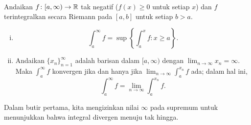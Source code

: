 \begin{prop} \label{impropriemann:possimp}
Andaikan $f \colon [a,\infty) \to {\mathbb{R}}$ tak negatif ($f(x)
\geq 0$ untuk setiap $x$) dan
$f$ terintegralkan secara Riemann pada $[a,b]$ untuk setiap $b > a$.
\begin{enumerate}[(i)]
\item 
\begin{equation*}
\int_a^\infty f = \sup \left\{ \int_a^x f : x \geq a \right\} .
\end{equation*}
\item
Andaikan $\{ x_n \}_{n=1}^\infty$ adalah barisan dalam $[a,\infty)$
dengan $\lim_{n\to\infty} x_n = \infty$.  Maka
$\int_a^\infty f$ konvergen jika dan hanya jika $\lim_{n\to\infty} \int_a^{x_n} f$ ada; dalam
hal ini,
\begin{equation*}
\int_a^\infty f = \lim_{n\to\infty} \int_a^{x_n} f .
\end{equation*}
\end{enumerate}
\end{prop}

Dalam butir pertama, kita mengizinkan nilai $\infty$ pada
supremum untuk menunjukkan bahwa integral divergen menuju tak hingga.

